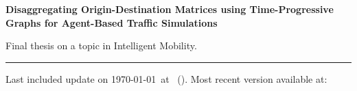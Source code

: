 \documentclass[12pt,a4paper,ragged2e,withhyper]{altacv} %
\begin{document}
\begin{paracol}{2}


\textbf{Disaggregating Origin-Destination Matrices
using Time-Progressive Graphs for Agent-Based Traffic Simulations}

Final thesis on a topic in Intelligent Mobility.

\smallskip

 

\smallskip





\end{paracol}

\vfill
\hrule
\medskip
\small{
    Last included update on \today~at \DTMcurrenttime~(\DTMcurrentzone).
    Most recent version available at: 
}
\end{document}
